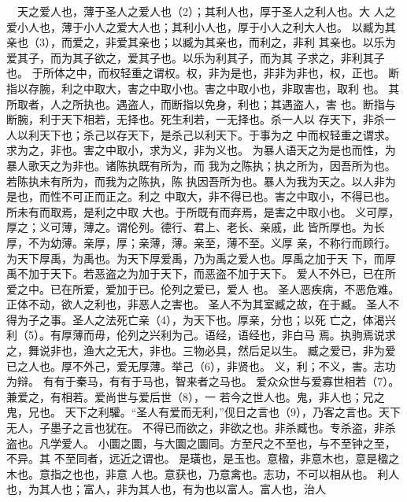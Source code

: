 \documentclass[12pt,UTF8]{ctexbook}
\begin{document}
　天之爱人也，薄于圣人之爱人也（2）；其利人也，厚于圣人之利人也。大 
人之爱小人也，薄于小人之爱大人也；其利小人也，厚于小人之利大人也。 
以臧为其亲也（3），而爱之，非爱其亲也；以臧为其亲也，而利之，非利 
其亲也。以乐为爱其子，而为其子欲之，爱其子也。以乐为利其子，而为其 
子求之，非利其子也。 
于所体之中，而权轻重之谓权。权，非为是也，非非为非也，权，正也。 
断指以存腕，利之中取大，害之中取小也。害之中取小也，非取害也，取利 
也。 
其所取者，人之所执也。遇盗人，而断指以免身，利也；其遇盗人，害 
也。断指与断腕，利于天下相若，无择也。死生利若，一无择也。杀一人以 
存天下，非杀一人以利天下也；杀己以存天下，是杀己以利天下。于事为之 
中而权轻重之谓求。求为之，非也。害之中取小，求为义，非为义也。 
为暴人语天之为是也而性，为暴人歌天之为非也。诸陈执既有所为，而 
我为之陈执；执之所为，因吾所为也。若陈执未有所为，而我为之陈执，陈 
执因吾所为也。暴人为我为天之。以人非为是也，而性不可正而正之。利之 
中取大，非不得已也。害之中取小，不得已也。所未有而取焉，是利之中取 
大也。于所既有而弃焉，是害之中取小也。 
义可厚，厚之；义可薄，薄之。谓伦列。德行、君上、老长、亲戚，此 
皆所厚也。为长厚，不为幼薄。亲厚，厚；亲薄，薄。亲至，薄不至。义厚 
亲，不称行而顾行。 
为天下厚禹，为禹也。为天下厚爱禹，乃为禹之爱人也。厚禹之加于天 
下，而厚禹不加于天下。若恶盗之为加于天下，而恶盗不加于天下。 
爱人不外已，已在所爱之中。已在所爱，爱加于已。伦列之爱已，爱人 
也。 
圣人恶疾病，不恶危难。正体不动，欲人之利也，非恶人之害也。 
圣人不为其室臧之故，在于臧。 
圣人不得为子之事。圣人之法死亡亲（4），为天下也。厚亲，分也；以死 
亡之，体渴兴利（5）。有厚薄而毋，伦列之兴利为己。语经，语经也，非白马 
焉。执驹焉说求之，舞说非也，渔大之无大，非也。三物必具，然后足以生。 
臧之爱已，非为爱已之人也。厚不外己，爱无厚薄。举己（6），非贤也。 
义，利；不义，害。志功为辩。 
有有于秦马，有有于马也，智来者之马也。 
爱众众世与爱寡世相若（7）。兼爱之，有相若。爱尚世与爱后世（8），一 
若今之世人也。鬼，非人也；兄之鬼，兄也。 
天下之利驩。“圣人有爱而无利，”伣日之言也（9），乃客之言也。天下 
无人，子墨子之言也犹在。 
不得已而欲之，非欲之也。非杀臧也。专杀盗，非杀盗也。凡学爱人。 
小圜之圜，与大圜之圜同。方至尺之不至也，与不至钟之至，不异。其 
不至同者，远近之谓也。 
是璜也，是玉也。意楹，非意木也，意是楹之木也。意指之也也，非意 
人也。意获也，乃意禽也。志功，不可以相从也。 
利人也，为其人也；富人，非为其人也，有为也以富人。富人也，治人 
\end{document}
